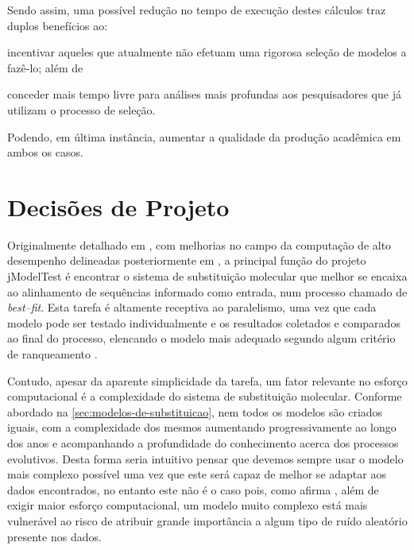 \documentclass[english,brazilian]{UNISINOSmonografia} %
\begin{document}
Sendo assim, uma possível redução no tempo de execução destes cálculos traz duplos benefícios ao: 
\begin{inparaenum} 
	\item incentivar aqueles que atualmente não efetuam uma rigorosa seleção de modelos a fazê-lo; além de 
	\item conceder mais tempo livre para análises mais profundas aos pesquisadores que já utilizam o processo de seleção.
\end{inparaenum}
Podendo, em última instância, aumentar a qualidade da produção acadêmica em ambos os casos.


\section{Decisões de Projeto}
\label{sec:modelo-decisoes}




Originalmente detalhado em , com melhorias no campo da computação de alto desempenho delineadas posteriormente em , a principal função do projeto jModelTest é encontrar o sistema de substituição molecular que melhor se encaixa ao alinhamento de sequências informado como entrada, num processo chamado de \textit{best--fit}.
Esta tarefa é altamente receptiva ao paralelismo, uma vez que cada modelo pode ser testado individualmente e os resultados coletados e comparados ao final do processo, elencando o modelo mais adequado segundo algum critério de ranqueamento \cite{Keane2006a}.


Contudo, apesar da aparente simplicidade da tarefa, um fator relevante no esforço computacional é a complexidade do sistema de substituição molecular.
Conforme abordado na \autoref{sec:modelos-de-substituicao}, nem todos os modelos são criados iguais, com a complexidade dos mesmos aumentando progressivamente ao longo dos anos e acompanhando a profundidade do conhecimento acerca dos processos evolutivos.
Desta forma seria intuitivo pensar que devemos sempre usar o modelo mais complexo possível uma vez que este será capaz de melhor se adaptar aos dados encontrados, no entanto este não é o caso pois, como afirma , além de exigir maior esforço computacional, um modelo muito complexo está mais vulnerável ao risco de atribuir grande importância a algum tipo de ruído aleatório presente nos dados.
\end{document}
